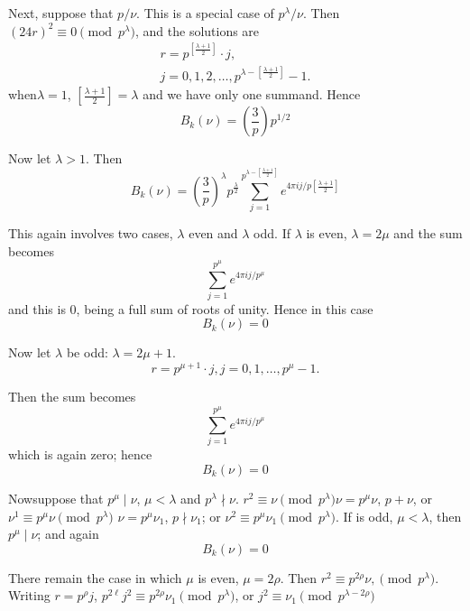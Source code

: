 Next, suppose that $p/\nu$. This is a special case of
$p^\lambda/\nu$. Then $(24r)^2 \equiv 0 \pmod{p^\lambda}$, and the
solutions are 
\begin{gather*}
  r= p^{\left[\frac{\lambda+1}{2} \right]}\cdot j,\\
  j=0, 1, 2, \ldots, p^{\lambda-\left[\frac{\lambda+1}{2} \right]}-1.
\end{gather*}
when\pageoriginale $\lambda=1$, $\left[\frac{\lambda+1}{2} \right]=
\lambda$ and we have only one summand. Hence
\begin{equation*}
  B_k(\nu) = \left(\frac{3}{p} \right) p^{1/2} \tag{3}\label{part3:lec25:eq3}
\end{equation*}

Now let $\lambda>1$. Then
$$
B_k (\nu) = \left(\frac{3}{p} \right)^\lambda p^{\frac{\lambda}{2}}
\sum^{p^{\lambda- \left[\frac{\lambda+1}{2} \right]}}_{j=1} e^{4 \pi i
j /p \left[\frac{\lambda+1}{2} \right]}
$$

This again involves two cases, $\lambda$ even and $\lambda$ odd. If
$\lambda$ is even, $\lambda= 2 \mu$ and the sum becomes
$$
\sum^{p^\mu}_{j=1} e^{4 \pi i j/p^\mu}
$$
and this is 0, being a full sum of roots of unity. Hence in this case
\begin{equation*}
  B_k (\nu) =0\tag{4}\label{part3:lec25:eq4}
\end{equation*}

Now let $\lambda$ be odd: $\lambda = 2 \mu +1$.
$$
r= p^{\mu+1}\cdot j, j=0,1,\ldots , p^\mu -1.
$$

Then the sum becomes
$$
\sum^{p^\mu}_{j=1} e^{4 \pi i j /p^\mu}
$$
which is again zero; hence
\begin{equation*}
  B_k (\nu) =0 \tag{5}\label{part3:lec25:eq5}
\end{equation*}

Now\pageoriginale suppose that $p^\mu\mid \nu$, $\mu < \lambda$ and
$p^\lambda \nmid \nu$. $r^2 \equiv \nu \pmod{p^\lambda} \nu= p^\mu \nu$,
$p+\nu$, or $\nu^1 \equiv p^\mu \nu \pmod{p^\lambda}$ $\nu = p^\mu
\nu_1$, $p \nmid \nu_1$; or $\nu^2\equiv p^\mu \nu_1 \pmod{
  p^\lambda}$. If is odd, $\mu< \lambda$, then $p^\mu \mid\nu$; and again
\begin{equation*}
  B_k (\nu) =0 \tag{6}\label{part3:lec25:eq6}
\end{equation*}

There remain the case in which $\mu$ is even, $\mu = 2 \rho$. Then
$r^2 \equiv p^{2 \rho} \nu, \pmod{p^\lambda}$. Writing $r= p^{\rho}
j$, $p^{2 \ell} j^2 \equiv p^{2 \rho} \nu_1 \pmod{p^\lambda}$, or
$j^2 \equiv \nu_1 \pmod{p^{\lambda- 2 \rho}}$

